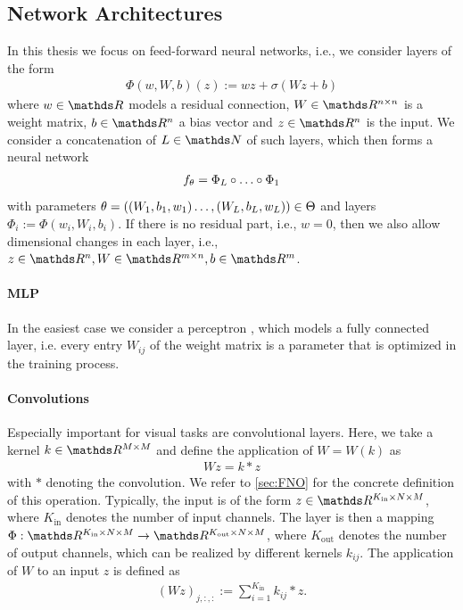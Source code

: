 \subsection{Network Architectures}
%
%
In this thesis we focus on feed-forward neural networks, i.e., we consider layers of the form
%
\begin{align}\label{eq:layer}
\Phi(w, W, b)(z):= wz + \sigma(Wz + b)
\end{align}
%
where $w\in\R$ models a residual connection, $W\in\R^{n\times n}$ is a weight matrix, $b\in\R^n$ a bias vector and $z\in\R^{n}$ is the input. We consider a concatenation of $L\in\N$ of such layers, which then forms a neural network
%
\begin{align*}
f_\theta = \Phi_L\circ\ldots\circ\Phi_1
\end{align*} 
%
with parameters $\theta =((W_1,b_1,w_1)\ldots,(W_L,b_L,w_L))\in\Theta$ and layers $\Phi_i := \Phi(w_i, W_i, b_i)$. If there is no residual part, i.e., $w=0$, then we also allow dimensional changes in each layer, i.e., $z\in\R^n, W\in\R^{m\times n}, b\in\R^m$. 
%
\paragraph{MLP} In the easiest case we consider a perceptron \cite{rosenblatt1958perceptron}, which models a fully connected layer, i.e. every entry $W_{ij}$ of the weight matrix is a parameter that is optimized in the training process.

\paragraph{Convolutions}\label{sec:convlayer} Especially important for visual tasks are convolutional layers. Here, we take a kernel $k\in \R^{M\times M}$ and define the application of $W=W(k)$ as
%
\begin{align*}
Wz = k\ast z
\end{align*}
%
with $\ast$ denoting the convolution. We refer to \cref{sec:FNO} for the concrete definition of this operation. Typically, the input is of the form $z\in\R^{K_{\text{in}}\times N \times M}$, where $K_{\text{in}}$ denotes the number of input channels. The layer is then a mapping $\Phi:\R^{K_{\text{in}}\times N \times M}\to\R^{K_{\text{out}}\times N \times M}$, where $K_{\text{out}}$ denotes the number of output channels, which can be realized by different kernels $k_{ij}$. The application of $W$ to an input $z$ is defined as
%
\begin{align*}
(Wz)_{j,:,:} := \sum_{i=1}^{K_{\text{in}}} k_{ij}\ast z.
\end{align*}

